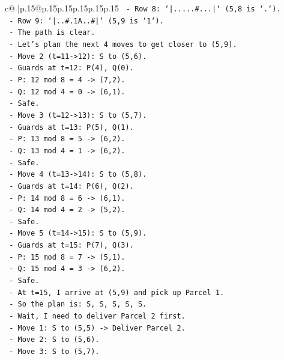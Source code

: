\documentclass{article}
\begin{document}
{\begin{supertabular}{c@{$\;$}|p{.15\linewidth}@{}p{.15\linewidth}p{.15\linewidth}p{.15\linewidth}p{.15\linewidth}p{.15\linewidth}}
{{{\texttt{    {-} Row 8: `|.....\#...|` (5,8 is `.`).} \\
\texttt{    {-} Row 9: `|..\#.1A..\#|` (5,9 is `1`).} \\
\texttt{  {-} The path is clear.} \\
\texttt{  {-} Let's plan the next 4 moves to get closer to (5,9).} \\
\texttt{  {-} Move 2 (t=11{-}>12): S to (5,6).} \\
\texttt{    {-} Guards at t=12: P(4), Q(0).} \\
\texttt{      {-} P: 12 mod 8 = 4 {-}> (7,2).} \\
\texttt{      {-} Q: 12 mod 4 = 0 {-}> (6,1).} \\
\texttt{    {-} Safe.} \\
\texttt{  {-} Move 3 (t=12{-}>13): S to (5,7).} \\
\texttt{    {-} Guards at t=13: P(5), Q(1).} \\
\texttt{      {-} P: 13 mod 8 = 5 {-}> (6,2).} \\
\texttt{      {-} Q: 13 mod 4 = 1 {-}> (6,2).} \\
\texttt{    {-} Safe.} \\
\texttt{  {-} Move 4 (t=13{-}>14): S to (5,8).} \\
\texttt{    {-} Guards at t=14: P(6), Q(2).} \\
\texttt{      {-} P: 14 mod 8 = 6 {-}> (6,1).} \\
\texttt{      {-} Q: 14 mod 4 = 2 {-}> (5,2).} \\
\texttt{    {-} Safe.} \\
\texttt{  {-} Move 5 (t=14{-}>15): S to (5,9).} \\
\texttt{    {-} Guards at t=15: P(7), Q(3).} \\
\texttt{      {-} P: 15 mod 8 = 7 {-}> (5,1).} \\
\texttt{      {-} Q: 15 mod 4 = 3 {-}> (6,2).} \\
\texttt{    {-} Safe.} \\
\texttt{    {-} At t=15, I arrive at (5,9) and pick up Parcel 1.} \\
\texttt{  {-} So the plan is: S, S, S, S, S.} \\
\texttt{  {-} Wait, I need to deliver Parcel 2 first.} \\
\texttt{  {-} Move 1: S to (5,5) {-}> Deliver Parcel 2.} \\
\texttt{  {-} Move 2: S to (5,6).} \\
\texttt{  {-} Move 3: S to (5,7).} \\
}}}
\end{supertabular}}
\end{document}
